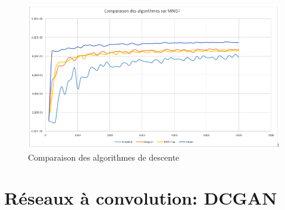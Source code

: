 \begin{figure}[ht!]
  \centering
    \includegraphics[width=\linewidth]{fig/comparaisonAlgos}
    \caption{Comparaison des algorithmes de descente }
  \label{fig:comp_algos}
\end{figure}


\section{Réseaux à convolution: DCGAN}

